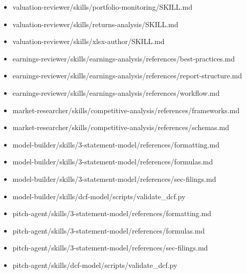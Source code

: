 \documentclass[11pt]{article}
\begin{document}
\begin{itemize}[leftmargin=*,itemsep=1pt,topsep=2pt]
\item \hspace*{2.7em}valuation-reviewer/skills/portfolio-monitoring/SKILL.md
\item \hspace*{2.7em}valuation-reviewer/skills/returns-analysis/SKILL.md
\item \hspace*{2.7em}valuation-reviewer/skills/xlsx-author/SKILL.md
\item \hspace*{3.6em}earnings-reviewer/skills/earnings-analysis/references/best-practices.md
\item \hspace*{3.6em}earnings-reviewer/skills/earnings-analysis/references/report-structure.md
\item \hspace*{3.6em}earnings-reviewer/skills/earnings-analysis/references/workflow.md
\item \hspace*{3.6em}market-researcher/skills/competitive-analysis/references/frameworks.md
\item \hspace*{3.6em}market-researcher/skills/competitive-analysis/references/schemas.md
\item \hspace*{3.6em}model-builder/skills/3-statement-model/references/formatting.md
\item \hspace*{3.6em}model-builder/skills/3-statement-model/references/formulas.md
\item \hspace*{3.6em}model-builder/skills/3-statement-model/references/sec-filings.md
\item \hspace*{3.6em}model-builder/skills/dcf-model/scripts/validate\_\allowbreak{}dcf.py
\item \hspace*{3.6em}pitch-agent/skills/3-statement-model/references/formatting.md
\item \hspace*{3.6em}pitch-agent/skills/3-statement-model/references/formulas.md
\item \hspace*{3.6em}pitch-agent/skills/3-statement-model/references/sec-filings.md
\item \hspace*{3.6em}pitch-agent/skills/dcf-model/scripts/validate\_\allowbreak{}dcf.py

\end{itemize}
\end{document}
